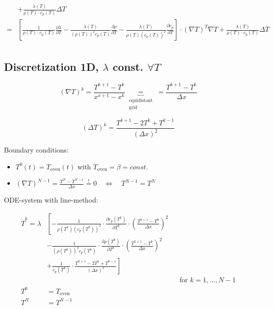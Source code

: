 \documentclass{scrartcl}[12pt, halfparskip]
\begin{document}
\begin{align*}
	& + \frac{\lambda (T)}{\rho (T) \cdot c_p (T)} \Delta T \\
	= & \left[ \frac{1}{\rho (T) \cdot c_p (T)} \frac{\partial \lambda}{\partial T} - \frac{\lambda (T)}{(\rho(T))^2 c_p(T)} \frac{\partial \rho}{\partial T} - \frac{\lambda (T)}{\rho(T) (c_p(T))^2} \frac{\partial c_p}{\partial T} \right] \cdot (\nabla T)^T \nabla T + \frac{\lambda (T)}{\rho (T) \cdot c_p (T)} \Delta T \\
\end{align*}

\subsection{Discretization 1D, $\lambda$ const. $\forall T$}

\begin{equation*}
	(\nabla T)^k = \frac{T^{k+1} - T^k}{x^{x+1} - x^k} \underbrace{=}_{\substack{\text{equidistant} \\ \text{grid}}} =  \frac{T^{k+1} - T^k}{\Delta x}
\end{equation*}

\begin{equation*}
	(\Delta T)^k = \frac{T^{k+1} - 2 T^k + T^{k-1}}{(\Delta x)^2}
\end{equation*}

Boundary conditions:

\begin{itemize}
	\item $T^0(t) = T_{\text{oven}}(t)$ \quad with \quad $\dot{ T}_{\text{oven}}= \beta = const.$
	\item $(\nabla T)^{N-1} = \frac{T^{N} - T^{N-1}}{\Delta x} \stackrel{!}{=} 0 \quad \Leftrightarrow \quad T^{N-1} = T^N$ 
\end{itemize}

ODE-system with line-method:

\begin{align*}
	\dot{T}^k = \lambda & \left[ - \frac{1}{\rho(T^k) (c_p(T^k))^2} \cdot \frac{\partial c_p(T^k)}{\partial T^k} \cdot \left( \frac{T^{k+1} - T^k}{\Delta x} \right)^2 \right. \\
	& \left. - \frac{1}{(\rho(T^k))^2 c_p(T^k)} \cdot \frac{\partial \rho(T^k)}{\partial T^k} \cdot \left( \frac{T^{k+1} - T^k}{\Delta x} \right)^2 \right. \\
	& \left. + \frac{1}{c_p(T^k)} \cdot \frac{T^{k+1} - 2 T^k + T^{k-1}}{(\Delta x)^2} \right] \\
	& & &\text{for } k = 1, ..., N-1 \\
	T^0 & = T_{\text{oven}} \\
	T^N & = T^{N-1}
\end{align*}
\end{document}
